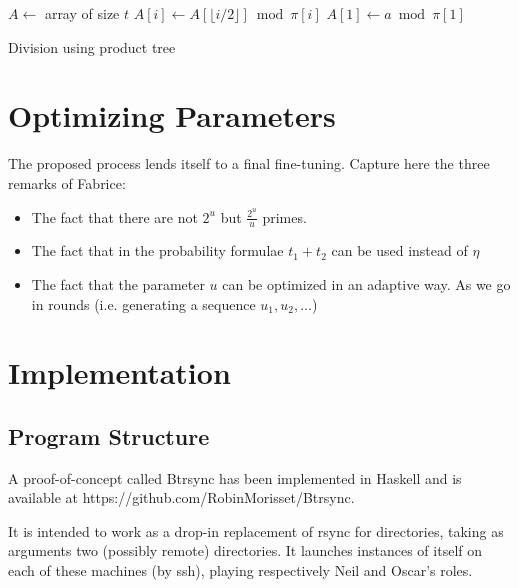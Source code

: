 \documentclass[11pt]{llncs}
\begin{document}
\begin{algorithm}
\newcommand{\vstart}{\ensuremath{\mathrm{start}}}
\newcommand{\vmid}{\ensuremath{\mathrm{mid}}}
\newcommand{\vend}{\ensuremath{\mathrm{end}}}
\begin{algorithmic}[1]
\State $A \gets $ array of size $t$
    \State $A[i] \gets A[\lfloor i/2 \rfloor] \bmod \pi[i]$
    \State {}
    \State {}
  \EndIf
\EndFunction
\State $A[1] \gets a \bmod \pi[1]$
\State {}
\State {}
\end{algorithmic}
\caption{Division using product tree}\label{alg:div-prod-tree}
\end{algorithm}

\section{Optimizing Parameters}

The proposed process lends itself to a final fine-tuning. Capture here the three remarks of Fabrice:

\begin{itemize}
\item The fact that there are not $2^u$ but $\frac{2^u}{u}$ primes.
\item The fact that in the probability formulae $t_1+t_2$ can be used instead of $\eta$
\item The fact that the parameter $u$ can be optimized in an adaptive way. As we go in rounds (i.e. generating a sequence $u_1,u_2,...$)
\end{itemize}

\section{Implementation}

\subsection{Program Structure}

A proof-of-concept called Btrsync has been implemented in Haskell and is
available at https://github.com/RobinMorisset/Btrsync.

It is intended to work as a drop-in replacement of rsync for directories, taking
as arguments two (possibly remote) directories. It launches instances of itself
on each of these machines (by ssh), playing respectively Neil and Oscar's roles.
\end{document}
